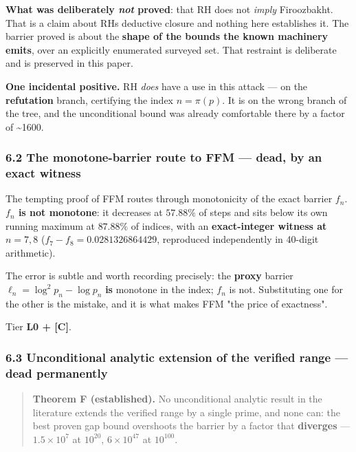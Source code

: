 \documentclass[
  a4paper,
  11pt]{article}
\begin{document}
\textbf{What was deliberately \emph{not} proved}: that RH does not
\emph{imply} Firoozbakht. That is a claim about RH\textquotesingle s
deductive closure and nothing here establishes it. The barrier proved is
about the \textbf{shape of the bounds the known machinery emits}, over
an explicitly enumerated surveyed set. That restraint is deliberate and
is preserved in this paper.

\textbf{One incidental positive.} RH \emph{does} have a use in this
attack --- on the \textbf{refutation} branch, certifying the index
\(n = \pi(p)\). It is on the wrong branch of the tree, and the
unconditional bound was already comfortable there by a factor of
\textasciitilde1600.

\subsubsection{6.2 The monotone-barrier route to FFM --- dead, by an
exact
witness}\label{62-the-monotone-barrier-route-to-ffm--dead-by-an-exact-witness}

The tempting proof of FFM routes through monotonicity of the exact
barrier \(f_n\). \textbf{\(f_n\) is not monotone}: it decreases at
\(57.88\%\) of steps and sits below its own running maximum at
\(87.88\%\) of indices, with an \textbf{exact-integer witness at
\(n = 7, 8\)} (\(f_7 - f_8 = 0.0281326864429\), reproduced independently
in 40-digit arithmetic).

The error is subtle and worth recording precisely: the \textbf{proxy}
barrier \(\ell_n = \log^2 p_n - \log p_n\) \textbf{is} monotone in the
index; \(f_n\) is not. Substituting one for the other is the mistake,
and it is what makes FFM "the price of exactness".

Tier \textbf{L0 + {[}C{]}}.

\subsubsection{6.3 Unconditional analytic extension of the verified
range --- dead
permanently}\label{63-unconditional-analytic-extension-of-the-verified-range--dead-permanently}

\begin{quote}
\textbf{Theorem F (established).} No unconditional analytic result in
the literature extends the verified range by a single prime, and none
can: the best proven gap bound overshoots the barrier by a factor that
\textbf{diverges} --- \(1.5\times10^{7}\) at \(10^{20}\),
\(6\times10^{47}\) at \(10^{100}\).
\end{quote}
\end{document}
